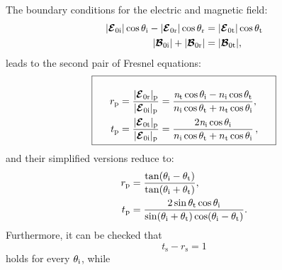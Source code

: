 The boundary conditions for the electric and magnetic field:
\begin{subequations}
\begin{align}
|\boldsymbol{\mathcal{E}}_{0 \textrm{i}}|\cos\theta_{\textrm{i}} - |\boldsymbol{\mathcal{E}}_{0 \textrm{r}}|\cos\theta_{\textrm{r}} &= 
|\boldsymbol{\mathcal{E}}_{0 \textrm{t}}|\cos\theta_{\textrm{t}}\\
|\boldsymbol{\mathcal{B}}_{0 \textrm{i}}| + 
|\boldsymbol{\mathcal{B}}_{0 \textrm{r}}| &= 
|\boldsymbol{\mathcal{B}}_{0 \textrm{t}}|,
\end{align}
\end{subequations}
leads to the second pair of Fresnel equations:
\begin{equation}
\fbox{\begin{minipage}{18em}
\begin{equation*}\label{Fresnel_parallel}
\begin{split}
r_{\textrm{p}} & = \frac{|\boldsymbol{\mathcal{E}}_{0 \textrm{r}}|_{\textrm{p}}}{|\boldsymbol{\mathcal{E}}_{0\textrm{i}}|_\textrm{p}} = \frac{\n_\textrm{t}\cos\myangle_\textrm{i}-n_\textrm{i} \cos\myangle_\textrm{t}}{n_\textrm{i} \cos\myangle_\textrm{t}+n_\textrm{t}\cos\myangle_\textrm{i}},\\
t_{\textrm{p}} & =\frac{|\boldsymbol{\mathcal{E}}_{0 \textrm{t}}|_{\textrm{p}}}{|\boldsymbol{\mathcal{E}}_{0\textrm{i}}|_\textrm{p}} =  \frac{2\n_\textrm{i}\cos\myangle_\textrm{i}}{n_\textrm{i}\cos\myangle_\textrm{t}+n_\textrm{t}\cos\myangle_\textrm{i}}\,,
\end{split}
\end{equation*}
\end{minipage}}
\end{equation}
and their simplified versions reduce to:
\begin{equation} \label{simple_Fresnel}
\begin{split}
r_{\textrm{p}} & =  \frac{\tan(\theta_\textrm{i}-\theta_\textrm{t})}{\tan(\theta_\textrm{i}+\theta_\textrm{t})},\\
t_{\textrm{p}} & = \frac{2\sin \theta_\textrm{t} \cos \theta_\textrm{i}}{\sin(\theta_\textrm{i}+\theta_\textrm{t})\cos(\theta_\textrm{i}- \theta_\textrm{t})}.
\end{split}
\end{equation}
Furthermore, it can be checked that
 \begin{equation}
t_\textrm{s}-r_\textrm{s} = 1
\end{equation}
holds for every $\theta_{\textrm{i}}$, while 
